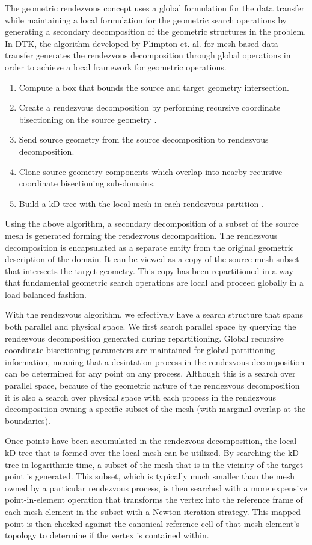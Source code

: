 \documentclass{mc2013}
\begin{document}
The geometric rendezvous concept uses a global formulation for the
data transfer while maintaining a local formulation for the geometric
search operations by generating a secondary decomposition of the
geometric structures in the problem. In DTK, the algorithm developed by
Plimpton et. al. \cite{Plimpton_2004} for mesh-based data transfer
generates the rendezvous decomposition through global operations in
order to achieve a local framework for geometric operations.
\begin{enumerate}
\item Compute a box that bounds the source and target geometry
  intersection.
\item Create a rendezvous decomposition by performing recursive
  coordinate bisectioning on the source geometry \cite{Berger_1987}.
\item Send source geometry from the source decomposition to rendezvous
  decomposition.
\item Clone source geometry components which overlap into nearby
  recursive coordinate bisectioning sub-domains.
\item Build a kD-tree with the local mesh in each rendezvous
  partition \cite{Bentley_1975}.
\end{enumerate}
Using the above algorithm, a secondary decomposition of a subset of
the source mesh is generated forming the rendezvous decomposition. The
rendezvous decomposition is encapsulated as a separate entity from the
original geometric description of the domain. It can be viewed as a
copy of the source mesh subset that intersects the target
geometry. This copy has been repartitioned in a way that fundamental
geometric search operations are local and proceed globally in a load
balanced fashion.

With the rendezvous algorithm, we effectively have a search structure
that spans both parallel and physical space. We first search parallel
space by querying the rendezvous decomposition generated during
repartitioning. Global recursive coordinate bisectioning parameters
are maintained for global partitioning information, meaning that a
desintation process in the rendezvous decomposition can be determined
for any point on any process. Although this is a search over parallel
space, because of the geometric nature of the rendezvous decomposition
it is also a search over physical space with each process in the
rendezvous decomposition owning a specific subset of the mesh (with
marginal overlap at the boundaries).
 
Once points have been accumulated in the rendezvous decomposition, the
local kD-tree that is formed over the local mesh can be utilized. By
searching the kD-tree in logarithmic time, a subset of the mesh that
is in the vicinity of the target point is generated. This subset,
which is typically much smaller than the mesh owned by a particular
rendezvous process, is then searched with a more expensive
point-in-element operation that transforms the vertex into the
reference frame of each mesh element in the subset with a Newton
iteration strategy. This mapped point is then checked against the
canonical reference cell of that mesh element's topology to determine
if the vertex is contained within.
\end{document}
